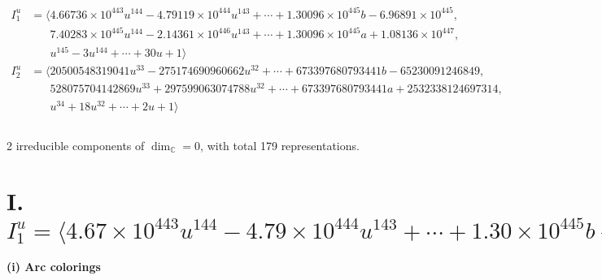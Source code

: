 \documentclass[1p]{elsarticle_modified}
\theoremstyle{definition}
\begin{document}
\begin{align*}
I^u_{1}&=\langle 
4.66736\times10^{443} u^{144}-4.79119\times10^{444} u^{143}+\cdots+1.30096\times10^{445} b-6.96891\times10^{445},\\
\phantom{I^u_{1}}&\phantom{= \langle  }7.40283\times10^{445} u^{144}-2.14361\times10^{446} u^{143}+\cdots+1.30096\times10^{445} a+1.08136\times10^{447},\\
\phantom{I^u_{1}}&\phantom{= \langle  }u^{145}-3 u^{144}+\cdots+30 u+1\rangle \\
I^u_{2}&=\langle 
20500548319041 u^{33}-275174690960662 u^{32}+\cdots+673397680793441 b-65230091246849,\\
\phantom{I^u_{2}}&\phantom{= \langle  }528075704142869 u^{33}+297599063074788 u^{32}+\cdots+673397680793441 a+2532338124697314,\\
\phantom{I^u_{2}}&\phantom{= \langle  }u^{34}+18 u^{32}+\cdots+2 u+1\rangle \\
\\
\end{align*}
\raggedright * 2 irreducible components of $\dim_{\mathbb{C}}=0$, with total 179 representations.\\
\newpage
\renewcommand{\arraystretch}{1}
\centering \section*{I. $I^u_{1}= \langle 4.67\times10^{443} u^{144}-4.79\times10^{444} u^{143}+\cdots+1.30\times10^{445} b-6.97\times10^{445},\;7.40\times10^{445} u^{144}-2.14\times10^{446} u^{143}+\cdots+1.30\times10^{445} a+1.08\times10^{447},\;u^{145}-3 u^{144}+\cdots+30 u+1 \rangle$}
\flushleft \textbf{(i) Arc colorings}\\
\end{document}
